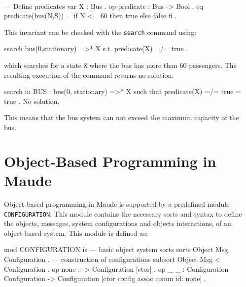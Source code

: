 \begin{example}
\\
\begin{maude}
--- Define predicates
  var X : Bus .
  op predicate : Bus -> Bool .
  eq predicate(bus(N,S)) = if N <= 60 then true else false fi .
\end{maude}
This invariant can be checked with the \texttt{search} command using:
\\
\begin{maude2}
search bus(0,stationary) =>* X  s.t. predicate(X) =/= true .
\end{maude2}
which searches for a state \texttt{X} where the bus has more than 60 passengers. The resulting execution of the command returns no solution: \\
\begin{maude2}
search in BUS : bus(0, stationary) =>* 
                X such that predicate(X) =/= true = true .
No solution.
\end{maude2}
This means that the bus system can not exceed the maximum capacity of the bus.


\end{example}


\section{Object-Based Programming in Maude}
Object-based programming in Maude \cite{MaudeManual, Lecture3, PeterMaude} is supported by a predefined module \texttt{CONFIGURATION}. This module contains the necessary sorts and syntax to define the objects, messages, system configurations and objects interactions, of an object-based system. This module is defined as:
\\
\begin{maude}
mod CONFIGURATION is
  --- basic object system sorts
  sorts Object Msg Configuration .
  --- construction of configurations
  subsort Object Msg < Configuration .
  op none : -> Configuration [ctor] .
  op _ _ : Configuration Configuration -> Configuration
           [ctor config assoc comm id: none] .
\end{maude}

